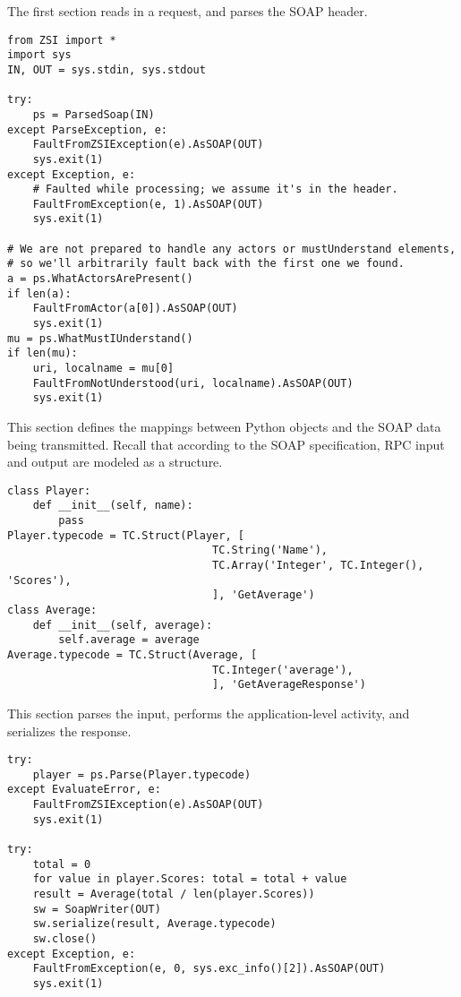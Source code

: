 The first section reads in a request, and parses the SOAP header.

\begin{verbatim}
from ZSI import *
import sys
IN, OUT = sys.stdin, sys.stdout

try:
    ps = ParsedSoap(IN)
except ParseException, e:
    FaultFromZSIException(e).AsSOAP(OUT)
    sys.exit(1)
except Exception, e:
    # Faulted while processing; we assume it's in the header.
    FaultFromException(e, 1).AsSOAP(OUT)
    sys.exit(1)

# We are not prepared to handle any actors or mustUnderstand elements,
# so we'll arbitrarily fault back with the first one we found.
a = ps.WhatActorsArePresent()
if len(a):
    FaultFromActor(a[0]).AsSOAP(OUT)
    sys.exit(1)
mu = ps.WhatMustIUnderstand()
if len(mu):
    uri, localname = mu[0]
    FaultFromNotUnderstood(uri, localname).AsSOAP(OUT)
    sys.exit(1)
\end{verbatim}

This section defines the mappings between Python objects and the SOAP
data being transmitted.
Recall that according to the SOAP specification, RPC input and output
are modeled as a structure.

\begin{verbatim}
class Player:
    def __init__(self, name):
        pass
Player.typecode = TC.Struct(Player, [
                                TC.String('Name'),
                                TC.Array('Integer', TC.Integer(), 'Scores'),
                                ], 'GetAverage')
class Average:
    def __init__(self, average):
        self.average = average
Average.typecode = TC.Struct(Average, [
                                TC.Integer('average'),
                                ], 'GetAverageResponse')
\end{verbatim}

This section parses the input, performs the application-level
activity, and serializes the response.
\begin{verbatim}
try:
    player = ps.Parse(Player.typecode)
except EvaluateError, e:
    FaultFromZSIException(e).AsSOAP(OUT)
    sys.exit(1)

try:
    total = 0
    for value in player.Scores: total = total + value
    result = Average(total / len(player.Scores))
    sw = SoapWriter(OUT)
    sw.serialize(result, Average.typecode)
    sw.close()
except Exception, e:
    FaultFromException(e, 0, sys.exc_info()[2]).AsSOAP(OUT)
    sys.exit(1)
\end{verbatim}

